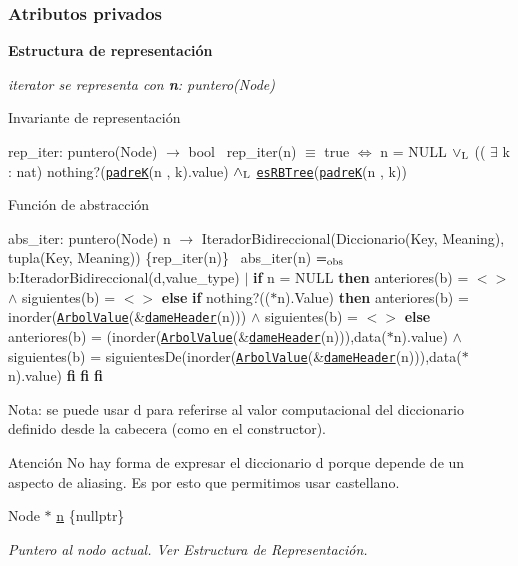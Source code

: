 \subsubsection*{Atributos privados}
\begin{Indent}{\bf Estructura de representación}\par
{\em iterator se representa con {\bfseries n}\+: puntero(\+Node)

\begin{DoxyParagraph}{Invariante de representación}

\end{DoxyParagraph}
rep\+\_\+iter\+: puntero(\+Node) $\to$ bool~\newline
rep\+\_\+iter(n) $\equiv$ true $\Leftrightarrow$ n = N\+U\+LL $\lor_{\rm L}$ (( $\exists$ k \+: nat) nothing?(\href{axiomas.html#padreK}{\tt padreK}(n , k).value) $\land_{\rm L}$ \href{axiomas.html#esRBTree}{\tt es\+R\+B\+Tree}(\href{axiomas.html#padreK}{\tt padreK}(n , k))

\begin{DoxyParagraph}{Función de abstracción}

\end{DoxyParagraph}
abs\+\_\+iter\+: puntero(\+Node) n $\to$ Iterador\+Bidireccional(Diccionario(Key, Meaning), tupla(Key, Meaning)) \{rep\+\_\+iter(n)\}~\newline
abs\+\_\+iter(n) $=_{\rm obs}$ b\+:Iterador\+Bidireccional(d,value\+\_\+type) $\vert$ {\bfseries if} n = N\+U\+LL {\bfseries then} anteriores(b) = $<$$>$ $\land$ siguientes(b) = $<$$>$ {\bfseries else} {\bfseries if} nothing?(($\ast$n).Value) {\bfseries then} anteriores(b) = inorder(\href{axiomas.html#ArbolValue}{\tt Arbol\+Value}(\&\href{axiomas.html#dameHeader}{\tt dame\+Header}(n))) $\land$ siguientes(b) = $<$$>$ {\bfseries else} anteriores(b) = (inorder(\href{axiomas.html#ArbolValue}{\tt Arbol\+Value}(\&\href{axiomas.html#dameHeader}{\tt dame\+Header}(n))),data($\ast$n).value) $\land$ siguientes(b) = siguientes\+De(inorder(\href{axiomas.html#ArbolValue}{\tt Arbol\+Value}(\&\href{axiomas.html#dameHeader}{\tt dame\+Header}(n))),data($\ast$n).value) {\bfseries fi} {\bfseries fi} {\bfseries fi} 

Nota\+: se puede usar {\ttfamily d} para referirse al valor computacional del diccionario definido desde la cabecera (como en el constructor).

\begin{DoxyAttention}{Atención}
No hay forma de expresar el diccionario {\ttfamily d} porque depende de un aspecto de aliasing. Es por esto que permitimos usar castellano. 
\end{DoxyAttention}
}\begin{DoxyCompactItemize}
\item 
Node $\ast$ \hyperlink{classaed2_1_1map_1_1iterator_adf8633ef71bb6c1fc01c0abe8728fd93_adf8633ef71bb6c1fc01c0abe8728fd93}{n} \{nullptr\}
\begin{DoxyCompactList}\small\item\em Puntero al nodo actual. Ver Estructura de Representación. \end{DoxyCompactList}\end{DoxyCompactItemize}
\end{Indent}


